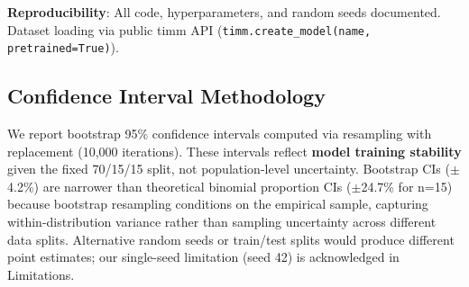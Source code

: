 \textbf{Reproducibility}: All code, hyperparameters, and random seeds documented. Dataset loading via public timm API (\texttt{timm.create\_model(name, pretrained=True)}).

\subsection{Confidence Interval Methodology}

We report bootstrap 95\% confidence intervals computed via resampling with replacement (10,000 iterations). These intervals reflect \textbf{model training stability} given the fixed 70/15/15 split, not population-level uncertainty. Bootstrap CIs ($\pm$4.2\%) are narrower than theoretical binomial proportion CIs ($\pm$24.7\% for n=15) because bootstrap resampling conditions on the empirical sample, capturing within-distribution variance rather than sampling uncertainty across different data splits. Alternative random seeds or train/test splits would produce different point estimates; our single-seed limitation (seed 42) is acknowledged in Limitations.
